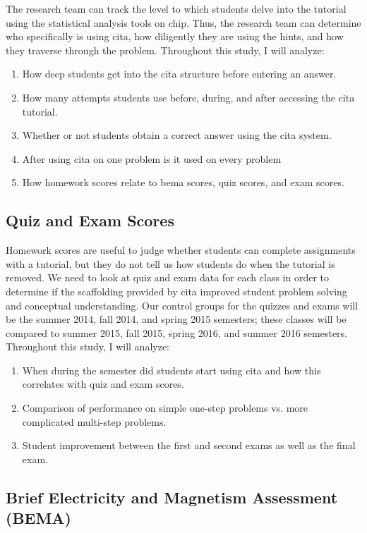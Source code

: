 The research team can track the level to which students delve into the tutorial using the statistical analysis tools on \gls{chip}. Thus, the research team can determine who specifically is using \gls{cita}, how diligently they are using the hints, and how they traverse through the problem. Throughout this study, I will analyze:

\begin{enumerate}
\item How deep students get into the \gls{cita} structure before entering an answer.
\item How many attempts students use before, during, and after accessing the \gls{cita} tutorial.
\item Whether or not students obtain a correct answer using the \gls{cita} system.
\item After using \gls{cita} on one problem is it used on every problem
\item How homework scores relate to \gls{bema} scores, quiz scores, and exam scores.
\end{enumerate}

\subsection{Quiz and Exam Scores}

Homework scores are useful to judge whether students can complete assignments with a tutorial, but they do not tell us how students do when the tutorial is removed. We need to look at quiz and exam data for each class in order to determine if the scaffolding provided by \gls{cita} improved student problem solving and conceptual understanding. Our control groups for the quizzes and exams will be the summer 2014, fall 2014, and spring 2015 semesters; these classes will be compared to summer 2015, fall 2015, spring 2016, and summer 2016 semesters. Throughout this study, I will analyze:

\begin{enumerate}
\item When during the semester did students start using \gls{cita} and how this correlates with quiz and exam scores.
\item Comparison of performance on simple one-step problems vs. more complicated multi-step problems.
\item Student improvement between the first and second exams as well as the final exam.
\end{enumerate}

\subsection{Brief Electricity and Magnetism Assessment (BEMA)}

